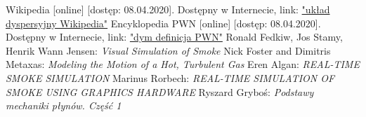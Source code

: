 \documentclass{article}
\begin{document}
        \begin{thebibliography}{}
             Wikipedia [online] [dostęp: 08.04.2020]. Dostępny w Internecie, link:
            \href{https://pl.wikipedia.org/wiki/Dyspersja_(chemia_fizyczna)}{"układ dyspersyjny Wikipedia"}
             Encyklopedia PWN [online] [dostęp: 08.04.2020]. Dostępny w Internecie, link: \href{https://encyklopedia.pwn.pl/haslo/dym;3895349.html}{"dym definicja PWN"}
             Ronald Fedkiw, Jos Stamy, Henrik Wann Jensen: \emph{Visual Simulation of Smoke}
             Nick Foster and Dimitris Metaxas: \emph{Modeling the Motion of a Hot, Turbulent Gas}
             Eren Algan: \emph{REAL-TIME SMOKE SIMULATION}
             Marinus Rorbech: \emph{REAL-TIME SIMULATION OF SMOKE USING GRAPHICS HARDWARE}
            Ryszard Gryboś: \emph{Podstawy mechaniki płynów. Część 1}
        \end{thebibliography}
        
\end{document}
